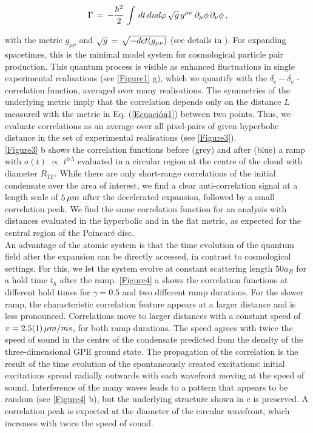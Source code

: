 \documentclass[11pt,twocolumn,letterpaper]{article}
\newcounter{ns}
\begin{document}
\begin{equation}
    \label{Eq.4}
    \Gamma \thinspace = \thinspace -\frac{\hslash^{2}}{2} \thinspace \int \thinspace dt \thinspace dud\varphi \thinspace \sqrt{g} \thinspace g^{\mu \nu} \thinspace \partial_{\mu} \phi \thinspace \partial_{\nu} \phi \thinspace , 
\end{equation}

with the metric $g_{\mu \nu}$ and $\sqrt{g} \thinspace = \thinspace \sqrt{-det (g_{\mu \nu})}$ (see details in \cite{Lb.32}). For expanding spacetimes, this is the minimal model system for cosmological particle pair production. This quantum process is visible as enhanced fluctuations in single experimental realisations (see \ref{Figure1} g), which we quantify with the $\delta_{c} - \delta_{c}$ -correlation function, averaged over many realisations. The symmetries of the underlying metric imply that the correlation depends only on the distance $L$ measured with the metric in Eq. (\ref{Ecuación1}) between two points. Thus, we evaluate correlations as an average over all pixel-pairs of given hyperbolic distance in the set of experimental realisations (see \ref{Figure3}).\\

\ref{Figure3} b shows the correlation functions before (grey) and after (blue) a ramp with $a(t)$ $\propto$ $t^{0.5}$ evaluated in a circular region at the centre of the cloud with diameter $R_{TF}$. While there are only short-range correlations of the initial condensate over the area of interest, we find a clear anti-correlation signal at a length scale of $5 \thinspace \mu m$ after the decelerated expansion, followed by a small correlation peak. We find the same correlation function for an analysis with distances evaluated in the hyperbolic and in the flat metric, as expected for the central region of the Poincaré disc.\\

An advantage of the atomic system is that the time evolution of the quantum field after the expansion can be directly accessed, in contrast to cosmological settings. For this, we let the system evolve at constant scattering length $50a_{B}$ for a hold time $t_{h}$ after the ramp. \ref{Figure4} a shows the correlation functions at different hold times for $\gamma = 0.5$ and two different ramp durations. For the slower ramp, the characteristic correlation feature appears at a larger distance and is less pronounced. Correlations move to larger distances with a constant speed of $v = 2.5(1) \thinspace \mu m / ms$, for both ramp durations. The speed agrees with twice the speed of sound in the centre of the condensate predicted from the density of the three-dimensional GPE ground state. The propagation of the correlation is the result of the time evolution of the spontaneously created excitations: initial excitations spread radially outwards with each wavefront moving at the speed of sound. Interference of the many waves leads to a pattern that appears to be random (see \ref{Figure4} b), but the underlying structure shown in c is preserved. A correlation peak is expected at the diameter of the circular wavefront, which increases with twice the speed of sound.
\end{document}
